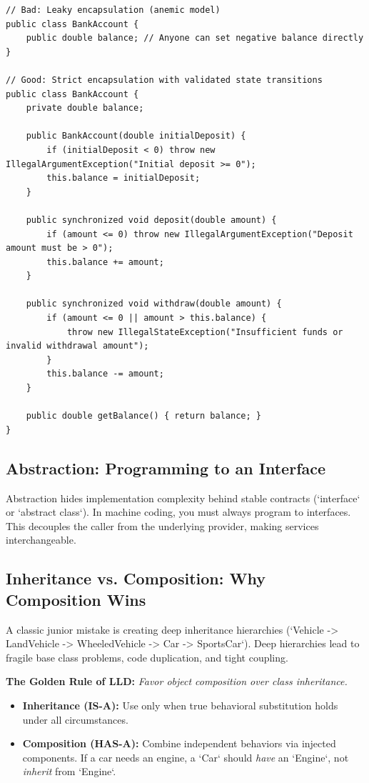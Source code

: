 \documentclass[10pt,journal,compsoc,onecolumn]{IEEEtran}
\begin{document}
\begin{verbatim}
// Bad: Leaky encapsulation (anemic model)
public class BankAccount {
    public double balance; // Anyone can set negative balance directly
}

// Good: Strict encapsulation with validated state transitions
public class BankAccount {
    private double balance;

    public BankAccount(double initialDeposit) {
        if (initialDeposit < 0) throw new IllegalArgumentException("Initial deposit >= 0");
        this.balance = initialDeposit;
    }

    public synchronized void deposit(double amount) {
        if (amount <= 0) throw new IllegalArgumentException("Deposit amount must be > 0");
        this.balance += amount;
    }

    public synchronized void withdraw(double amount) {
        if (amount <= 0 || amount > this.balance) {
            throw new IllegalStateException("Insufficient funds or invalid withdrawal amount");
        }
        this.balance -= amount;
    }

    public double getBalance() { return balance; }
}
\end{verbatim}

\subsection{Abstraction: Programming to an Interface}
Abstraction hides implementation complexity behind stable contracts (`interface` or `abstract class`). In machine coding, you must always program to interfaces. This decouples the caller from the underlying provider, making services interchangeable.

\subsection{Inheritance vs. Composition: Why Composition Wins}
A classic junior mistake is creating deep inheritance hierarchies (`Vehicle -> LandVehicle -> WheeledVehicle -> Car -> SportsCar`). Deep hierarchies lead to fragile base class problems, code duplication, and tight coupling.

\textbf{The Golden Rule of LLD:} \emph{Favor object composition over class inheritance.}
\begin{itemize}
    \item \textbf{Inheritance (IS-A):} Use only when true behavioral substitution holds under all circumstances.
    \item \textbf{Composition (HAS-A):} Combine independent behaviors via injected components. If a car needs an engine, a `Car` should \emph{have} an `Engine`, not \emph{inherit} from `Engine`.
\end{itemize}
\end{document}
